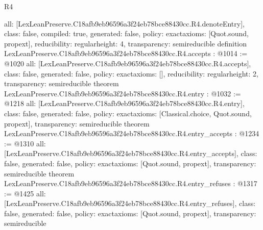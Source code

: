 \begin{lexlean}{R4}
\begin{coremodule}
{  all: [LexLeanPreserve.C18afb9eb96596a3f24eb78bce88430cc.R4.denoteEntry],
  class: false,
  compiled: true,
  generated: false,
  policy: exact{axioms: [Quot.sound, propext]},
  reducibility: regular{height: 4},
  transparency: semireducible
}
definition LexLeanPreserve.C18afb9eb96596a3f24eb78bce88430cc.R4.accepts : @1014 := @1020 {
  all: [LexLeanPreserve.C18afb9eb96596a3f24eb78bce88430cc.R4.accepts],
  class: false,
  generated: false,
  policy: exact{axioms: []},
  reducibility: regular{height: 2},
  transparency: semireducible
}
theorem LexLeanPreserve.C18afb9eb96596a3f24eb78bce88430cc.R4.entry : @1032 := @1218 {
  all: [LexLeanPreserve.C18afb9eb96596a3f24eb78bce88430cc.R4.entry],
  class: false,
  generated: false,
  policy: exact{axioms: [Classical.choice, Quot.sound, propext]},
  transparency: semireducible
}
theorem LexLeanPreserve.C18afb9eb96596a3f24eb78bce88430cc.R4.entry_accepts : @1234 := @1310 {
  all: [LexLeanPreserve.C18afb9eb96596a3f24eb78bce88430cc.R4.entry_accepts],
  class: false,
  generated: false,
  policy: exact{axioms: [Quot.sound, propext]},
  transparency: semireducible
}
theorem LexLeanPreserve.C18afb9eb96596a3f24eb78bce88430cc.R4.entry_refuses : @1317 := @1425 {
  all: [LexLeanPreserve.C18afb9eb96596a3f24eb78bce88430cc.R4.entry_refuses],
  class: false,
  generated: false,
  policy: exact{axioms: [Quot.sound, propext]},
  transparency: semireducible
}


\end{coremodule}
\end{lexlean}
